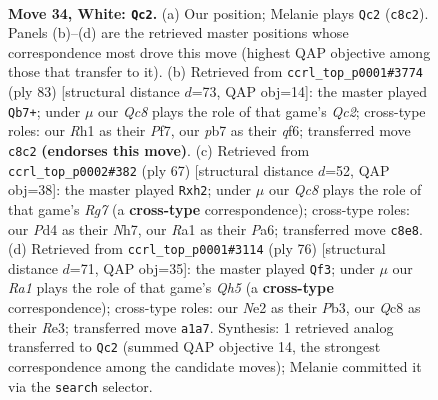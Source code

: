 \documentclass[11pt]{article}
\begin{document}
\clearpage

\begin{figure}[p]\centering
\begin{subfigure}{0.46\textwidth}\centering
\resizebox{\linewidth}{!}{%
\newchessgame
\chessboard[
  setfen={2Q2n2/pp4kp/7p/1P6/3P4/3r1q2/4N3/R5KR w - - 3 34},
  showmover=false,
  pgfstyle=straightmove, color=movearrow, markmove={c8-c2}
]}
\caption{}
\end{subfigure}\hfill
\begin{subfigure}{0.46\textwidth}\centering
\resizebox{\linewidth}{!}{%
\newchessgame
\chessboard[
  setfen={6k1/2q2p2/5Q1p/4P3/4P3/1KN3Pn/3r3P/3R4 b - - 7 42},
  showmover=false,
  pgfstyle=straightmove, color=movearrow, markmove={c7-b7}
]}
\caption{}
\end{subfigure}
\\[4pt]
\begin{subfigure}{0.46\textwidth}\centering
\resizebox{\linewidth}{!}{%
\newchessgame
\chessboard[
  setfen={5r1k/2q4n/p2N1p2/8/4Q3/8/PPP1N1rP/1K1R4 b - - 3 34},
  showmover=false,
  pgfstyle=straightmove, color=movearrow, markmove={g2-h2}
]}
\caption{}
\end{subfigure}\hfill
\begin{subfigure}{0.46\textwidth}\centering
\resizebox{\linewidth}{!}{%
\newchessgame
\chessboard[
  setfen={2r2k2/3q1p2/4n3/p6Q/P1N5/1P1pR1P1/8/5K2 w - - 4 39},
  showmover=false,
  pgfstyle=straightmove, color=movearrow, markmove={h5-f3}
]}
\caption{}
\end{subfigure}
\caption{\textbf{Move 34, White: \texttt{Qc2}.} (a) Our position; Melanie plays \texttt{Qc2} (\texttt{c8c2}). Panels (b)--(d) are the retrieved master positions whose correspondence most drove this move (highest QAP objective among those that transfer to it). (b) Retrieved from \texttt{ccrl\_top\_p0001\#3774} (ply 83) [structural distance $d$=73, QAP obj=14]: the master played \texttt{Qb7+}; under $\mu$ our \emph{Qc8} plays the role of that game's \emph{Qc2}; cross-type roles: our \emph{R}h1 as their \emph{P}f7, our \emph{p}b7 as their \emph{q}f6; transferred move \texttt{c8c2} \textbf{(endorses this move)}. (c) Retrieved from \texttt{ccrl\_top\_p0002\#382} (ply 67) [structural distance $d$=52, QAP obj=38]: the master played \texttt{Rxh2}; under $\mu$ our \emph{Qc8} plays the role of that game's \emph{Rg7} (a \textbf{cross-type} correspondence); cross-type roles: our \emph{P}d4 as their \emph{N}h7, our \emph{R}a1 as their \emph{P}a6; transferred move \texttt{c8e8}. (d) Retrieved from \texttt{ccrl\_top\_p0001\#3114} (ply 76) [structural distance $d$=71, QAP obj=35]: the master played \texttt{Qf3}; under $\mu$ our \emph{Ra1} plays the role of that game's \emph{Qh5} (a \textbf{cross-type} correspondence); cross-type roles: our \emph{N}e2 as their \emph{P}b3, our \emph{Q}c8 as their \emph{R}e3; transferred move \texttt{a1a7}. Synthesis: 1 retrieved analog transferred to \texttt{Qc2} (summed QAP objective 14, the strongest correspondence among the candidate moves); Melanie committed it via the \texttt{search} selector.}
\label{fig:thought-m66}
\end{figure}
\end{document}
